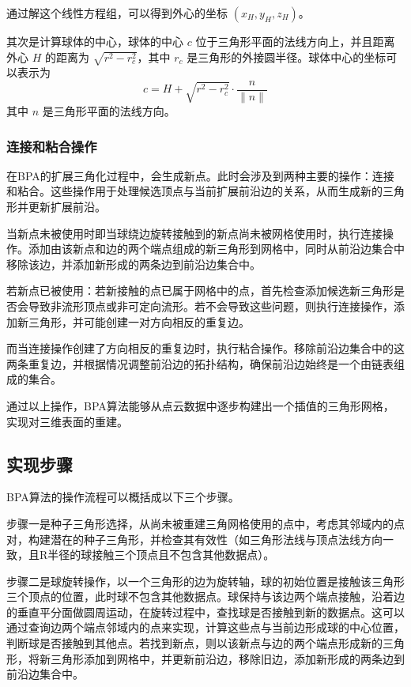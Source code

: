 \documentclass{xduugthesis}
\begin{document}
通过解这个线性方程组，可以得到外心的坐标 \( (x_H, y_H, z_H) \)。

其次是计算球体的中心，球体的中心 \( c \) 位于三角形平面的法线方向上，并且距离外心 \( H \) 的距离为 \( \sqrt{r^2 - r_c^2} \)，其中 \( r_c \) 是三角形的外接圆半径。球体中心的坐标可以表示为
\begin{equation}
c = H + \sqrt{r^2 - r_c^2} \cdot \frac{n}{\|n\|}
\end{equation}
其中 \( n \) 是三角形平面的法线方向。

\subsubsection{连接和粘合操作}
在BPA的扩展三角化过程中，会生成新点。此时会涉及到两种主要的操作：连接和粘合。这些操作用于处理候选顶点与当前扩展前沿边的关系，从而生成新的三角形并更新扩展前沿。

当新点未被使用时即当球绕边旋转接触到的新点尚未被网格使用时，执行连接操作。添加由该新点和边的两个端点组成的新三角形到网格中，同时从前沿边集合中移除该边，并添加新形成的两条边到前沿边集合中。

若新点已被使用：若新接触的点已属于网格中的点，首先检查添加候选新三角形是否会导致非流形顶点或非可定向流形。若不会导致这些问题，则执行连接操作，添加新三角形，并可能创建一对方向相反的重复边。

而当连接操作创建了方向相反的重复边时，执行粘合操作。移除前沿边集合中的这两条重复边，并根据情况调整前沿边的拓扑结构，确保前沿边始终是一个由链表组成的集合。

通过以上操作，BPA算法能够从点云数据中逐步构建出一个插值的三角形网格，实现对三维表面的重建。
\subsection{实现步骤}
BPA算法的操作流程可以概括成以下三个步骤。

步骤一是种子三角形选择，从尚未被重建三角网格使用的点中，考虑其邻域内的点对，构建潜在的种子三角形，并检查其有效性（如三角形法线与顶点法线方向一致，且R半径的球接触三个顶点且不包含其他数据点）。

步骤二是球旋转操作，以一个三角形的边为旋转轴，球的初始位置是接触该三角形三个顶点的位置，此时球不包含其他数据点。球保持与该边两个端点接触，沿着边的垂直平分面做圆周运动，在旋转过程中，查找球是否接触到新的数据点。这可以通过查询边两个端点邻域内的点来实现，计算这些点与当前边形成球的中心位置，判断球是否接触到其他点。若找到新点，则以该新点与边的两个端点形成新的三角形，将新三角形添加到网格中，并更新前沿边，移除旧边，添加新形成的两条边到前沿边集合中。
\end{document}
